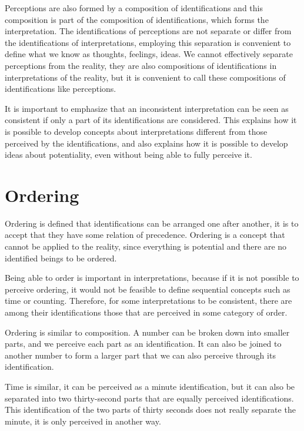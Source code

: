 \documentclass[11pt]{article}
\begin{document}
	Perceptions are also formed by a composition of identifications and this composition is part of the composition of identifications, which forms the interpretation. The identifications of perceptions are not separate or differ from the identifications of interpretations, employing this separation is convenient to define what we know as thoughts, feelings, ideas. We cannot effectively separate perceptions from the reality, they are also compositions of identifications in interpretations of the  reality, but it is convenient to call these compositions of identifications like perceptions.
	
	It is important to emphasize that an inconsistent interpretation can be seen as consistent if only a part of its identifications are considered. This explains how it is possible to develop concepts about interpretations different from those perceived by the identifications, and also explains how it is possible to develop ideas about potentiality, even without being able to fully perceive it.
	
	\section{Ordering} \label{pt-s6}
	
	Ordering is defined that identifications can be arranged one after another, it is to accept that they have some relation of precedence. Ordering is a concept that cannot be applied to the reality, since everything is potential and there are no identified beings to be ordered.
	
	Being able to order is important in interpretations, because if it is not possible to perceive ordering, it would not be feasible to define sequential concepts such as time or counting. Therefore, for some interpretations to be consistent, there are among their identifications those that are perceived in some category of order.
	
	Ordering is similar to composition. A number can be broken down into smaller parts, and we perceive each part as an identification. It can also be joined to another number to form a larger part that we can also perceive through its identification.
	
	Time is similar, it can be perceived as a minute identification, but it can also be separated into two thirty-second parts that are equally perceived identifications. This identification of the two parts of thirty seconds does not really separate the minute, it is only perceived in another way.
	
\end{document}
